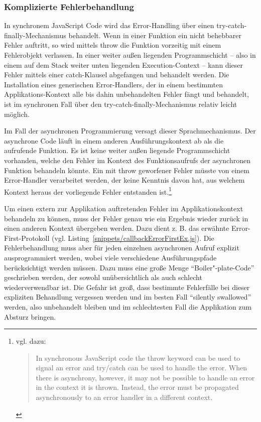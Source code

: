 \documentclass[
11pt, %
a4paper, %
oneside, %
pdfspacing, %
headinclude,
BCOR5mm, %
ngerman, %
bibtotocnumbered,
]{scrartcl}
\begin{document}
	\subsubsection{Komplizierte Fehlerbehandlung} 
	In synchronem JavaScript Code wird das Error-Handling über einen \textsf{try-catch-finally}-Mechanismus behandelt. Wenn in einer Funktion ein nicht behebbarer Fehler auftritt, so wird mittels \textsf{throw} die Funktion vorzeitig mit einem Fehlerobjekt verlassen. In einer weiter außen liegenden Programmschicht -- also in einem auf dem Stack weiter unten liegenden Execution-Context -- kann dieser Fehler mittels einer \textsf{catch}-Klausel abgefangen und behandelt werden. Die Installation eines generischen Error-Handlers, der in einem bestimmten Applikations-Kontext alle bis dahin unbehandelten Fehler fängt und behandelt, ist im synchronen Fall über den \textsf{try-catch-finally}-Mechanismus relativ leicht möglich. 
	
	Im Fall der asynchronen Programmierung versagt dieser Sprachmechanismus. Der asynchrone Code läuft in einem anderen Ausführungskontext ab als die aufrufende Funktion. Es ist keine weiter außen liegende Programmschicht vorhanden, welche den Fehler im Kontext des Funktionsaufrufs der asynchronen Funktion behandeln könnte. Ein mit \textsf{throw} geworfener Fehler müsste von einem Error-Handler verarbeitet werden, der keine Kenntnis davon hat, aus welchem Kontext heraus der vorliegende Fehler entstanden ist.\footnote{vgl. dazu: \begin{quote}In synchronous JavaScript code the throw keyword can be used to signal an error and try/catch can be used to handle the error. When there is asynchrony, however, it may not be possible to handle an error in the context it is thrown. Instead, the error must be propagated asynchronously to an error handler in a different context.~\citep[S.~2]{Gallaba.b}\end{quote}}
	
	Um einen extern zur Applikation auftretenden Fehler im Applikationskontext behandeln zu können, muss der Fehler genau wie ein Ergebnis wieder zurück in einen anderen Kontext übergeben werden. 	Dazu dient z. B. das erwähnte Error-First-Protokoll (vgl. Listing~\ref{snippets/callbackErrorFirstEx.js}). Die Fehlerbehandlung muss aber für jeden einzelnen asynchronen Aufruf explizit ausprogrammiert werden, wobei viele verschiedene Ausführungspfade berücksichtigt werden müssen. Dazu muss eine große Menge "`Boiler"-plate-Code"' geschrieben werden, der sowohl unübersichtlich als auch schlecht wiederverwendbar ist. Die Gefahr ist groß, dass bestimmte Fehlerfälle bei dieser expliziten Behandlung vergessen werden und im besten Fall "`silently swallowed"' werden, also unbehandelt bleiben und im schlechtesten Fall die Applikation zum Absturz bringen.
	
\end{document}

